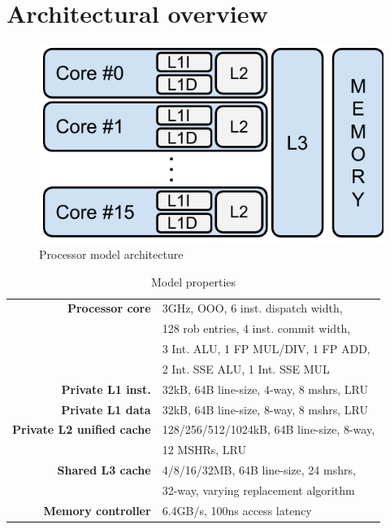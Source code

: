 \section{Architectural overview}

\begin{figure}[ht]
\centering
\includegraphics[scale=.5]{figures/processor_model/processor_model}
\caption{Processor model architecture}
\label{fig:processor_model}
\end{figure}

\begin{table}[ht]
\centering
\begin{tabular}{rl}
\toprule
\bf{Processor core}                 & 3GHz, OOO, 6 inst. dispatch width,     \\
                                    & 128 rob entries, 4 inst. commit width, \\
                                    & 3 Int. ALU, 1 FP MUL/DIV, 1 FP ADD, \\
                                    & 2 Int. SSE ALU, 1 Int. SSE MUL \\
\bf{Private L1 inst.}               & 32kB, 64B line-size, 4-way, 8 mshrs, LRU \\
\bf{Private L1 data}                & 32kB, 64B line-size, 8-way, 8 mshrs, LRU \\
\bf{Private L2 unified cache}       & 128/256/512/1024kB, 64B line-size, 8-way, \\
                                    & 12 MSHRs, LRU      \\
\bf{Shared L3 cache}                & 4/8/16/32MB, 64B line-size, 24 mshrs, \\
                                    & 32-way, varying replacement algorithm         \\
\bf{Memory controller}              & 6.4GB/s, 100ns access latency         \\
\bottomrule                             
\end{tabular}
\caption{Model properties}
\label{tbl:processor_model:properties}
\end{table}

